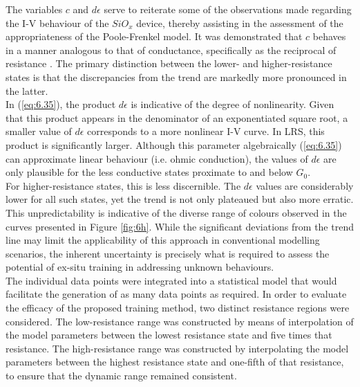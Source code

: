 \noindent The variables $c$ and $d\epsilon$ serve to reiterate some of the observations made regarding the I-V behaviour of the $SiO_x$ device, thereby assisting in the assessment of the appropriateness of the Poole-Frenkel model. It was demonstrated that $c$ behaves in a manner analogous to that of conductance, specifically as the reciprocal of resistance \cite{joksas2022memristive}. The primary distinction between the lower- and higher-resistance states is that the discrepancies from the trend are markedly more pronounced in the latter. \\

\noindent In (\ref{eq:6.35}), the product $d\epsilon$ is indicative of the degree of nonlinearity. Given that this product appears in the denominator of an exponentiated square root, a smaller value of $d\epsilon$ corresponds to a more nonlinear I-V curve. In LRS, this product is significantly larger. Although this parameter algebraically (\ref{eq:6.35}) can approximate linear behaviour (i.e. ohmic conduction), the values of $d\epsilon$ are only plausible for the less conductive states proximate to and below $G_0$. \\

\noindent For higher-resistance states, this is less discernible. The $d\epsilon$ values are considerably lower for all such states, yet the trend is not only plateaued but also more erratic. This unpredictability is indicative of the diverse range of colours observed in the curves presented in Figure \ref{fig:6h}. While the significant deviations from the trend line may limit the applicability of this approach in conventional modelling scenarios, the inherent uncertainty is precisely what is required to assess the potential of ex-situ training in addressing unknown behaviours. \\

\noindent The individual data points were integrated into a statistical model that would facilitate the generation of as many data points as required. In order to evaluate the efficacy of the proposed training method, two distinct resistance regions were considered. The low-resistance range was constructed by means of interpolation of the model parameters between the lowest resistance state and five times that resistance. The high-resistance range was constructed by interpolating the model parameters between the highest resistance state and one-fifth of that resistance, to ensure that the dynamic range remained consistent. \\

